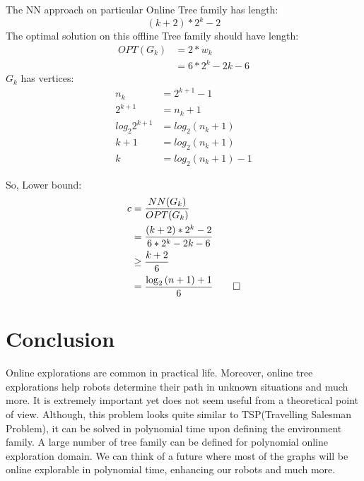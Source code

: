 \documentclass{report}
\begin{document}
{
        The {NN} approach on particular Online Tree family has length: 
            $$(k+2)*2^k-2$$
}
{
        The optimal solution on this offline Tree family should have length: 
            \begin{align*}
                OPT(G_k) &= 2*w_k \\
                         &= 6*2^k - 2k - 6
            \end{align*}
    }
{
          {$G_k$} has vertices:
          \begin{align*}
              n_k &= 2^{k+1}-1 \\ 
              2^{k+1} &= n_k + 1 \\ 
              log_2{2^{k+1}} &= log_2{(n_k + 1)} \\ 
              k + 1 &= log_2{(n_k + 1)} \\ 
              k &= log_2{(n_k + 1)} - 1 
          \end{align*}
}

So, Lower bound: 
        \begin{align*}
            c   &= \frac{NN(G_k)}{OPT(G_k)} \\
                &= \frac{(k+2)*2^k - 2}{6*2^k - 2k - 6} \\
                &\geq \frac{k+2}{6} \\
                &= \frac{\log_2{(n+1)}+1}{6} \qed  
        \end{align*}



\chapter{Conclusion}
Online explorations are common in practical life. Moreover, online tree explorations help robots determine their path in unknown situations and much more. It is extremely important yet does not seem useful from a theoretical point of view. 
Although, this problem looks quite similar to TSP(Travelling Salesman Problem), it can be solved in polynomial time upon defining the environment family. A large number of tree family can be defined for polynomial online exploration domain. We can think of a future where most of the graphs will be online explorable in polynomial time, enhancing our robots and much more.

\nocite{*}                                          
\printbibliography
\end{document}
